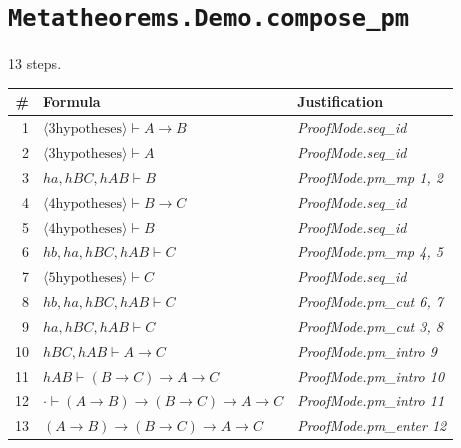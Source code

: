 \section*{\texttt{Metatheorems.Demo.compose\_pm}}
13 steps.

\begin{longtable}{r l l}
\hline
\# & Formula & Justification \\
\hline
\endhead
1 & $\langle 3 \text{hypotheses}\rangle   \vdash  A  \to  B$ & \textit{ProofMode.seq\_id} \\
2 & $\langle 3 \text{hypotheses}\rangle   \vdash  A$ & \textit{ProofMode.seq\_id} \\
3 & $ha, hBC, hAB  \vdash  B$ & \textit{ProofMode.pm\_mp 1, 2} \\
4 & $\langle 4 \text{hypotheses}\rangle   \vdash  B  \to  C$ & \textit{ProofMode.seq\_id} \\
5 & $\langle 4 \text{hypotheses}\rangle   \vdash  B$ & \textit{ProofMode.seq\_id} \\
6 & $hb, ha, hBC, hAB  \vdash  C$ & \textit{ProofMode.pm\_mp 4, 5} \\
7 & $\langle 5 \text{hypotheses}\rangle   \vdash  C$ & \textit{ProofMode.seq\_id} \\
8 & $hb, ha, hBC, hAB  \vdash  C$ & \textit{ProofMode.pm\_cut 6, 7} \\
9 & $ha, hBC, hAB  \vdash  C$ & \textit{ProofMode.pm\_cut 3, 8} \\
10 & $hBC, hAB  \vdash  A  \to  C$ & \textit{ProofMode.pm\_intro 9} \\
11 & $hAB  \vdash  (B  \to  C)  \to  A  \to  C$ & \textit{ProofMode.pm\_intro 10} \\
12 & $\cdot  \vdash  (A  \to  B)  \to  (B  \to  C)  \to  A  \to  C$ & \textit{ProofMode.pm\_intro 11} \\
13 & $(A  \to  B)  \to  (B  \to  C)  \to  A  \to  C$ & \textit{ProofMode.pm\_enter 12} \\
\hline
\end{longtable}
